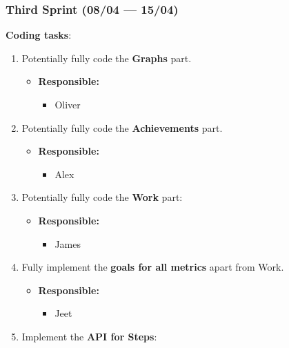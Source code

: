 \documentclass[12pt]{article}
\begin{document}
\hypertarget{third-sprint-0804-1504}{%
\subsubsection{Third Sprint (08/04 ---
15/04)}\label{third-sprint-0804-1504}}

\textbf{Coding tasks}:

\begin{enumerate}
\def\labelenumi{\arabic{enumi}.}
\tightlist
\item
  Potentially fully code the \textbf{Graphs} part.

  \begin{itemize}
  \tightlist
  \item
    \textbf{Responsible:}

    \begin{itemize}
    \tightlist
    \item
      Oliver
    \end{itemize}
  \end{itemize}
\item
  Potentially fully code the \textbf{Achievements} part.

  \begin{itemize}
  \tightlist
  \item
    \textbf{Responsible:}

    \begin{itemize}
    \tightlist
    \item
      Alex
    \end{itemize}
  \end{itemize}
\item
  Potentially fully code the \textbf{Work} part:

  \begin{itemize}
  \tightlist
  \item
    \textbf{Responsible:}

    \begin{itemize}
    \tightlist
    \item
      James
    \end{itemize}
  \end{itemize}
\item
  Fully implement the \textbf{goals for all metrics} apart from Work.

  \begin{itemize}
  \tightlist
  \item
    \textbf{Responsible:}

    \begin{itemize}
    \tightlist
    \item
      Jeet
    \end{itemize}
  \end{itemize}
\item
  Implement the \textbf{API for Steps}:


\end{enumerate}
\end{document}
